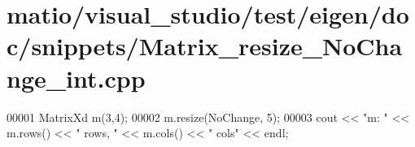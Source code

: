 \hypertarget{matio_2visual__studio_2test_2eigen_2doc_2snippets_2_matrix__resize___no_change__int_8cpp_source}{}\section{matio/visual\+\_\+studio/test/eigen/doc/snippets/\+Matrix\+\_\+resize\+\_\+\+No\+Change\+\_\+int.cpp}
\label{matio_2visual__studio_2test_2eigen_2doc_2snippets_2_matrix__resize___no_change__int_8cpp_source}

\begin{DoxyCode}
00001 MatrixXd m(3,4);
00002 m.resize(NoChange, 5);
00003 cout << \textcolor{stringliteral}{"m: "} << m.rows() << \textcolor{stringliteral}{" rows, "} << m.cols() << \textcolor{stringliteral}{" cols"} << endl;
\end{DoxyCode}
